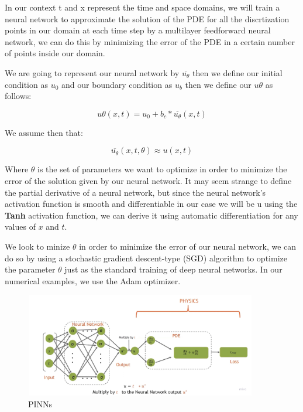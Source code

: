 \documentclass{article}
\begin{document}
In our context t and x represent the time and space domains, we will train a neural network to approximate the solution of the PDE for all the discrtization points in our domain 
at each time step  by a multilayer feedforward neural network, we can do this by minimizing the error of the PDE in a certain number of points inside our domain.

We are going to represent our neural network by $\overline{u_\theta}$ then we define our initial condition as $u_0$ and our boundary condition as $u_b$ then we define our $u\theta$ as follows:

$$
u\theta(x,t) = u_0 + b_c * \overline{u_\theta}(x,t)
$$

We assume then that:

$$\overline{u_\theta}(x,t,\theta)\approx u(x,t)$$ 

Where $\theta$ is the set of parameters we want to optimize in order to minimize the error of the solution given by our neural network.
It may seem strange to define the partial derivative of a neural network, but since the neural network's activation function is smooth and differentiable in our case we will be u
using the \textbf{Tanh} activation function, we can derive it using automatic differentiation for any values of $x$ and $t$.

We look to minize $\theta$ in order to minimize the error of our neural network, we can do so by using  a stochastic gradient descent-type (SGD) algorithm to optimize the parameter $\theta$ just 
as the standard training of deep neural networks. In our numerical examples, we use the Adam optimizer.


\begin{figure}[H]
    \centering
    \includegraphics[width=0.9\textwidth]{images/loss.jpg}
    \caption{PINNs}
\end{figure}
\end{document}
